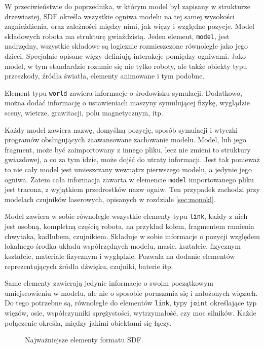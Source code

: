 	W przeciwieństwie do poprzednika, w którym model był zapisany w strukturze drzewiastej, SDF określa wszystkie ogniwa modelu na tej samej wysokości zagnieżdżenia, 
	oraz zależności między nimi, jak więzy i względne pozycje.
	Model składowych robota ma strukturę gwiaździstą. Jeden element, \texttt{model}, jest nadrzędny, wszystkie składowe są logicznie rozmieszczone równolegle jako jego dzieci.
	Specjalnie opisane więzy definiują interakcje pomiędzy ogniwami.
	Jako model, w tym standardzie rozumie się nie tylko roboty, ale także obiekty typu przeszkody, źródła światła, elementy animowane i tym podobne.

	Element typu \texttt{world} zawiera informacje o środowisku symulacji.
	Dodatkowo, można dodać informację o ustawieniach maszyny symulującej fizykę, wyglądzie sceny, wietrze, grawitacji, polu magnetycznym, itp.

	Każdy model zawiera nazwę, domyślną pozycję, sposób symulacji i wtyczki programów obsługujących zaawansowane zachowanie modelu.
	Model, lub jego fragment, może być zaimportowany z innego pliku, lecz nie zmieni to struktury gwiazdowej, a co za tym idzie, może dojść do utraty informacji.
	Jest tak ponieważ to nie cały model jest umieszczany wewnątrz pierwszego modelu, a jedynie jego ogniwa. Zatem cała informacja zawarta w elemencie \texttt{model}
	importowanego pliku jest tracona, z wyjątkiem przedrostków nazw ogniw.
	Ten przypadek zachodzi przy modelach czujników laserowych, opisanych w rozdziale \ref{sec:monokl}.

	Model zawiera w sobie równolegle wszystkie elementy typu \texttt{link}, każdy z nich jest osobną, kompletną częścią robota, na przykład kołem, 
	fragmentem ramienia chwytaka, kadłubem, czujnikiem.
	Składuje w sobie informacje o pozycji względem lokalnego środka układu współrzędnych modelu, masie, kształcie, fizycznym kształcie, materiale fizycznym i wyglądzie.
	Pozwala na dodanie elementów reprezentujących źródła dźwięku, czujniki, baterie itp.

	Same elementy zawierają jedynie informacje o swoim początkowym umiejscowieniu w modelu, ale nie o sposobie poruszania się i nałożonych więzach.
	Do tego potrzebne są, równoległe do elementów \texttt{link}, typy \texttt{joint} określające typ więzów, osie, współczynniki sprężystości, wytrzymałość, czy moc silników.
	Każde połączenie określa, między jakimi obiektami się łączy.
	
	\begin{figure}[h]
	\caption{Najważniejsze elementy formatu SDF.}
	\label{fig:sdf_dir}
	\end{figure} 
	
